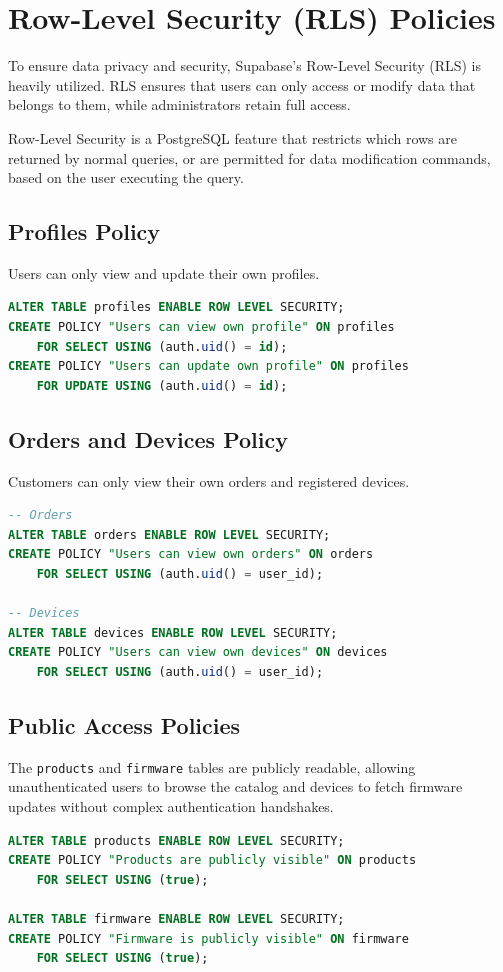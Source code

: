 \section{Row-Level Security (RLS) Policies}

To ensure data privacy and security, Supabase's Row-Level Security (RLS) is heavily utilized. RLS ensures that users can only access or modify data that belongs to them, while administrators retain full access.

\begin{infobox}
Row-Level Security is a PostgreSQL feature that restricts which rows are returned by normal queries, or are permitted for data modification commands, based on the user executing the query.
\end{infobox}

\subsection{Profiles Policy}
Users can only view and update their own profiles.
\begin{lstlisting}[language=SQL]
ALTER TABLE profiles ENABLE ROW LEVEL SECURITY;
CREATE POLICY "Users can view own profile" ON profiles
    FOR SELECT USING (auth.uid() = id);
CREATE POLICY "Users can update own profile" ON profiles
    FOR UPDATE USING (auth.uid() = id);
\end{lstlisting}

\subsection{Orders and Devices Policy}
Customers can only view their own orders and registered devices.
\begin{lstlisting}[language=SQL]
-- Orders
ALTER TABLE orders ENABLE ROW LEVEL SECURITY;
CREATE POLICY "Users can view own orders" ON orders
    FOR SELECT USING (auth.uid() = user_id);

-- Devices
ALTER TABLE devices ENABLE ROW LEVEL SECURITY;
CREATE POLICY "Users can view own devices" ON devices
    FOR SELECT USING (auth.uid() = user_id);
\end{lstlisting}

\subsection{Public Access Policies}
The \texttt{products} and \texttt{firmware} tables are publicly readable, allowing unauthenticated users to browse the catalog and devices to fetch firmware updates without complex authentication handshakes.

\begin{lstlisting}[language=SQL]
ALTER TABLE products ENABLE ROW LEVEL SECURITY;
CREATE POLICY "Products are publicly visible" ON products
    FOR SELECT USING (true);

ALTER TABLE firmware ENABLE ROW LEVEL SECURITY;
CREATE POLICY "Firmware is publicly visible" ON firmware
    FOR SELECT USING (true);
\end{lstlisting}
